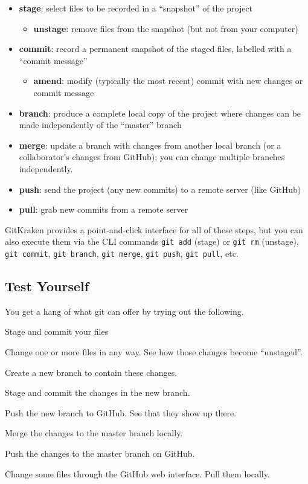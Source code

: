 \documentclass[12pt, a4paper]{article}
\begin{document}
\begin{itemize}
\item \textbf{stage}: select files to be recorded in a ``snapshot'' of the project
	\begin{itemize}
	\item \textbf{unstage}: remove files from the snapshot (but not from your computer)
	\end{itemize}
\item \textbf{commit}: record a permanent snapshot of the staged files, labelled with a ``commit message''
	\begin{itemize}
	\item \textbf{amend}: modify (typically the most recent) commit with new changes or commit message
	\end{itemize}
\item \textbf{branch}: produce a complete local copy of the project where changes can be made independently of the ``master'' branch
\item \textbf{merge}: update a branch with changes from another local branch (or a collaborator's changes from GitHub); you can change multiple branches independently.
\item \textbf{push}: send the project (any new commits) to a remote server (like GitHub)
\item \textbf{pull}: grab new commits from a remote server
\end{itemize}

GitKraken provides a point-and-click interface for all of these steps, but you can also execute them via the CLI commands \texttt{git add} (stage) or \texttt{git rm} (unstage), \texttt{git commit}, \texttt{git branch}, \texttt{git merge}, \texttt{git push}, \texttt{git pull}, etc.

\subsection*{Test Yourself}

You get a hang of what git can offer by trying out the following.

\begin{enumerate*}
\item Stage and commit your files
\item Change one or more files in any way. See how those changes become ``unstaged''.
\item Create a new branch to contain these changes.
\item Stage and commit the changes in the new branch.
\item Push the new branch to GitHub. See that they show up there.
\item Merge the changes to the master branch locally.
\item Push the changes to the master branch on GitHub.
\item Change some files through the GitHub web interface. Pull them locally.
\end{enumerate*}
\end{document}
